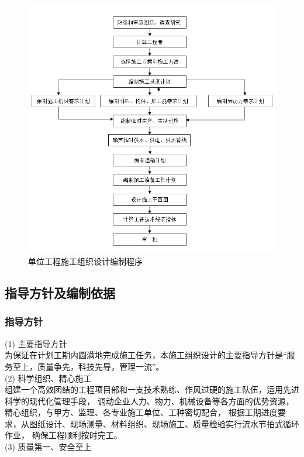 \begin{figure}[thbp!]
    \centering
    \includegraphics[width=0.8\linewidth]{figure/c1f1.png}
    \caption{单位工程施工组织设计编制程序}
    \label{fig:c1f1}
\end{figure}

\subsection{指导方针及编制依据}

\subsubsection{指导方针}

(1) 主要指导方针\\

为保证在计划工期内圆满地完成施工任务，本施工组织设计的主要指导方针是“服务至上，质量争先，科技先导，管理一流”。\\

(2) 科学组织、精心施工\\

组建一个高效团结的工程项目部和一支技术熟练、作风过硬的施工队伍，运用先进科学的现代化管理手段，
调动企业人力、物力、机械设备等各方面的优势资源，精心组织，与甲方、监理、各专业施工单位、工种密切配合，
根据工期进度要求，从图纸设计、现场测量、材料组织、现场施工、质量检验实行流水节拍式循环作业，
确保工程顺利按时完工。\\

(3) 质量第一、安全至上\\

